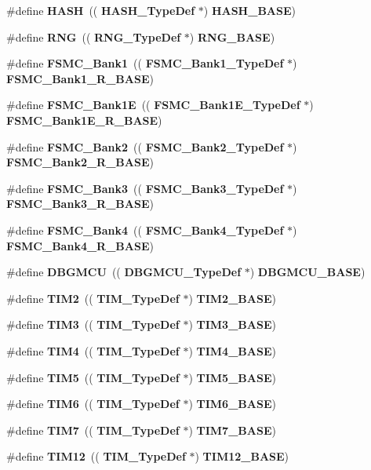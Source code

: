 \begin{DoxyCompactItemize}
\item 
\#define \textbf{ H\+A\+SH}~((\textbf{ H\+A\+S\+H\+\_\+\+Type\+Def} $\ast$) \textbf{ H\+A\+S\+H\+\_\+\+B\+A\+SE})
\item 
\#define \textbf{ R\+NG}~((\textbf{ R\+N\+G\+\_\+\+Type\+Def} $\ast$) \textbf{ R\+N\+G\+\_\+\+B\+A\+SE})
\item 
\#define \textbf{ F\+S\+M\+C\+\_\+\+Bank1}~((\textbf{ F\+S\+M\+C\+\_\+\+Bank1\+\_\+\+Type\+Def} $\ast$) \textbf{ F\+S\+M\+C\+\_\+\+Bank1\+\_\+\+R\+\_\+\+B\+A\+SE})
\item 
\#define \textbf{ F\+S\+M\+C\+\_\+\+Bank1E}~((\textbf{ F\+S\+M\+C\+\_\+\+Bank1\+E\+\_\+\+Type\+Def} $\ast$) \textbf{ F\+S\+M\+C\+\_\+\+Bank1\+E\+\_\+\+R\+\_\+\+B\+A\+SE})
\item 
\#define \textbf{ F\+S\+M\+C\+\_\+\+Bank2}~((\textbf{ F\+S\+M\+C\+\_\+\+Bank2\+\_\+\+Type\+Def} $\ast$) \textbf{ F\+S\+M\+C\+\_\+\+Bank2\+\_\+\+R\+\_\+\+B\+A\+SE})
\item 
\#define \textbf{ F\+S\+M\+C\+\_\+\+Bank3}~((\textbf{ F\+S\+M\+C\+\_\+\+Bank3\+\_\+\+Type\+Def} $\ast$) \textbf{ F\+S\+M\+C\+\_\+\+Bank3\+\_\+\+R\+\_\+\+B\+A\+SE})
\item 
\#define \textbf{ F\+S\+M\+C\+\_\+\+Bank4}~((\textbf{ F\+S\+M\+C\+\_\+\+Bank4\+\_\+\+Type\+Def} $\ast$) \textbf{ F\+S\+M\+C\+\_\+\+Bank4\+\_\+\+R\+\_\+\+B\+A\+SE})
\item 
\#define \textbf{ D\+B\+G\+M\+CU}~((\textbf{ D\+B\+G\+M\+C\+U\+\_\+\+Type\+Def} $\ast$) \textbf{ D\+B\+G\+M\+C\+U\+\_\+\+B\+A\+SE})
\item 
\#define \textbf{ T\+I\+M2}~((\textbf{ T\+I\+M\+\_\+\+Type\+Def} $\ast$) \textbf{ T\+I\+M2\+\_\+\+B\+A\+SE})
\item 
\#define \textbf{ T\+I\+M3}~((\textbf{ T\+I\+M\+\_\+\+Type\+Def} $\ast$) \textbf{ T\+I\+M3\+\_\+\+B\+A\+SE})
\item 
\#define \textbf{ T\+I\+M4}~((\textbf{ T\+I\+M\+\_\+\+Type\+Def} $\ast$) \textbf{ T\+I\+M4\+\_\+\+B\+A\+SE})
\item 
\#define \textbf{ T\+I\+M5}~((\textbf{ T\+I\+M\+\_\+\+Type\+Def} $\ast$) \textbf{ T\+I\+M5\+\_\+\+B\+A\+SE})
\item 
\#define \textbf{ T\+I\+M6}~((\textbf{ T\+I\+M\+\_\+\+Type\+Def} $\ast$) \textbf{ T\+I\+M6\+\_\+\+B\+A\+SE})
\item 
\#define \textbf{ T\+I\+M7}~((\textbf{ T\+I\+M\+\_\+\+Type\+Def} $\ast$) \textbf{ T\+I\+M7\+\_\+\+B\+A\+SE})
\item 
\#define \textbf{ T\+I\+M12}~((\textbf{ T\+I\+M\+\_\+\+Type\+Def} $\ast$) \textbf{ T\+I\+M12\+\_\+\+B\+A\+SE})

\end{DoxyCompactItemize}
